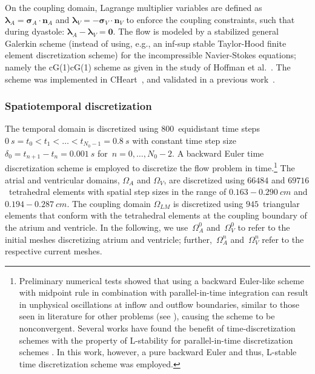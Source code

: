 \documentclass[3p]{elsarticle}
\begin{document}
On the coupling domain, Lagrange multiplier variables are defined
as $\boldsymbol{\lambda}_A = \boldsymbol{\sigma}_A \cdot \boldsymbol{n}_A$
and $\boldsymbol{\lambda}_V = - \boldsymbol{\sigma}_V \cdot \boldsymbol{n}_V$
to enforce the coupling constraints,
such that during dyastole: $\boldsymbol{\lambda}_A - \boldsymbol{\lambda}_V = \boldsymbol{0}$.
The flow is modeled by a stabilized general Galerkin scheme
(instead of using, e.g., an inf-sup stable Taylor-Hood finite element discretization scheme)
for the incompressible Navier-Stokes equations;
namely the cG(1)cG(1) scheme as given in the study of
Hoffman et al.~\cite{HoffmanJanssonDeabreu2011}.
The scheme was implemented in CHeart~\cite{CHeart,LeeEtAl2016},
and validated in a previous work~\cite{HessenthalerRoehrleNordsletten2017}.
\subsubsection{Spatiotemporal discretization}
\label{lv-flow-application-spatiotemporal-discretization-sec}
The temporal domain is discretized using $800$~equidistant time steps
$0~s = t_0 < t_1 < \ldots < t_{N_0 - 1} = 0.8~s$
with constant time step size~$\delta_0 = t_{n+1} - t_n = 0.001~s$ for~$n = 0, \ldots, N_0 - 2$.
A backward Euler time discretization scheme is employed
to discretize the flow problem in time.\footnote{Preliminary
numerical tests showed that using a backward Euler-like scheme
with midpoint rule in combination with parallel-in-time integration
can result in unphysical oscillations at inflow and outflow boundaries,
similar to those seen in literature for other problems (see \cite{HessenthalerNordslettenRoehrleSchroderFalgout2018}),
causing the scheme to be nonconvergent.
Several works have found the benefit of time-discretization schemes with the property of L-stability
for parallel-in-time discretization schemes
\cite{DobrevKolevPeterssonSchroder2017,Southworth2019,HessenthalerSouthworthNordslettenRoehrleFalgoutSchroder2020}.
In this work, however,
a pure backward Euler and thus, L-stable time discretization scheme was employed.}
The atrial and ventricular domains, $\Omega_A$ and $\Omega_V$,
are discretized using $66484$ and $69716$~tetrahedral elements
with spatial step sizes in the range of
$0.163 - 0.290~cm$ and $0.194 - 0.287~cm$.
The coupling domain $\Omega_{LM}$ is discretized using $945$~triangular elements
that conform with the tetrahedral elements at the coupling boundary
of the atrium and ventricle.
In the following, we use~$\Omega_A^0$ and~$\Omega_V^0$ to refer to the initial meshes
discretizing atrium and ventricle; further,~$\Omega_A^n$ and~$\Omega_V^n$
refer to the respective current meshes.
\end{document}
